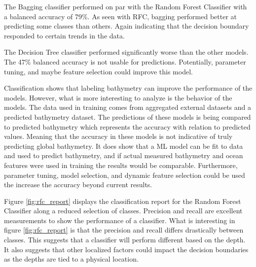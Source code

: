 \par
The Bagging classifier performed on par with the Random Forest Classifier with a balanced accuracy of 79\%.
As seen with \ac{RFC}, bagging performed better at predicting some classes than others.
Again indicating that the decision boundary responded to certain trends in the data.

\par
The Decision Tree classifier performed significantly worse than the other models.
The 47\% balanced accuracy is not usable for predictions.
Potentially, parameter tuning, and maybe feature selection could improve this model.

\par
Classification shows that labeling bathymetry can improve the performance of the models.
However, what is more interesting to analyze is the behavior of the models.
The data used in training comes from aggregated external datasets and a predicted bathymetry dataset.
The predictions of these models is being compared to predicted bathymetry which represents the accuracy with relation to predicted values.
Meaning that the accuracy in these models is not indicative of truly predicting global bathymetry.
It does show that a \ac{ML} model can be fit to data and used to predict bathymetry, and if actual measured bathymetry and ocean features were used in training the results would be comparable.
Furthermore, parameter tuning, model selection, and dynamic feature selection could be used the increase the accuracy beyond current results.

\par
Figure \ref{fig:rfc_report} displays the classification report for the Random Forest Classifier along a reduced selection of classes.
Precision and recall are excellent measurements to show the performance of a classifier.
What is interesting in figure \ref{fig:rfc_report} is that the precision and recall differs drastically between classes.
This suggests that a classifier will perform different based on the depth.
It also suggests that other localized factors could impact the decision boundaries as the depths are tied to a physical location.
